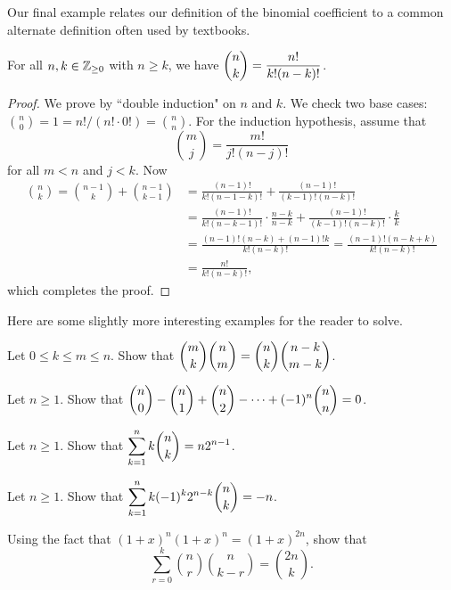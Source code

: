 \documentclass{article}
\begin{document}
Our final example relates our definition of the binomial coefficient to a common alternate definition often used by textbooks.
\begin{proposition}\label{factorial formula for binom}
For all $n, k\in \mathbb Z_{\geq 0}$ with $n \geq k$, we have $\displaystyle\binom nk = \frac{n!}{k!(n-k)!}$.
\end{proposition}
\begin{proof}
We prove by ``double induction" on $n$ and $k$. We check two base cases: $\binom n0 = 1 = n!/(n! \cdot 0!) = \binom nn$. For the induction hypothesis, assume that
$$\binom mj = \frac{m!}{j!(n-j)!}$$
for all $m<n$ and $j<k$. Now
\begin{align*}
\binom nk = \binom{n-1}k + \binom{n-1}{k-1} &= \frac{(n-1)!}{k!(n-1-k)!} + \frac{(n-1)!}{(k-1)!(n-k)!} \\
&= \frac{(n-1)!}{k!(n-k-1)!} \cdot \frac{n-k}{n-k} + \frac{(n-1)!}{(k-1)!(n-k)!} \cdot \frac kk \\
&= \frac{(n-1)! (n-k) + (n-1)!k}{k!(n-k)!} = \frac{(n-1)!(n-k+k)}{k!(n-k)!} \\
&= \frac{n!}{k!(n-k)!},
\end{align*}
which completes the proof.
\end{proof}
Here are some slightly more interesting examples for the reader to solve.
\begin{exercise}
Let $0\leq k\leq m\leq n$. Show that $\displaystyle\binom mk\binom nm = \binom nk\binom{n-k}{m-k}$.
\end{exercise}
\begin{exercise}
Let $n\geq 1$. Show that $\displaystyle\binom n0-\binom n1 + \binom n2 - \cdots + (-1)^n\binom nn = 0$.
\end{exercise}
\begin{exercise}
Let $n\geq 1$. Show that $\displaystyle\sum_{k=1}^n k\binom nk = n2^{n-1}$.
\end{exercise}
\begin{exercise}
Let $n\geq 1$. Show that $\displaystyle\sum_{k=1}^n k(-1)^k 2^{n-k}\binom nk = -n$.
\end{exercise}
\begin{exercise}
Using the fact that $(1+x)^n(1+x)^n = (1+x)^{2n}$, show that
$$\sum_{r=0}^k \binom nr\binom n{k-r} = \binom{2n} k.$$
\end{exercise}
\end{document}

